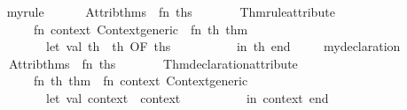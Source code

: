 \begin{isabellebody}
\begin{isamarkuptext}
\begin{description}
  \end{description}%
\end{isamarkuptext}%
\isamarkuptrue%
%
\isadelimML
\ \ %
\endisadelimML
%
\isatagML
{}\isamarkupfalse%
\ my{}rule\ {}\ {}\isanewline
\ \ \ \ Attrib{}thms\ {}{}\ {}fn\ ths\ {}{}\isanewline
\ \ \ \ \ \ Thm{}rule{}attribute\isanewline
\ \ \ \ \ \ \ \ {}fn\ context{}\ Context{}generic\ {}{}\ fn\ th{}\ thm\ {}{}\isanewline
\ \ \ \ \ \ \ \ \ \ let\ val\ th{}\ {}\ th\ OF\ ths\isanewline
\ \ \ \ \ \ \ \ \ \ in\ th{}\ end{}{}\ {}\isanewline
\isanewline
\ \ \isamarkupfalse%
\ my{}declaration\ {}\ {}\isanewline
\ \ \ \ Attrib{}thms\ {}{}\ {}fn\ ths\ {}{}\isanewline
\ \ \ \ \ \ Thm{}declaration{}attribute\isanewline
\ \ \ \ \ \ \ \ {}fn\ th{}\ thm\ {}{}\ fn\ context{}\ Context{}generic\ {}{}\isanewline
\ \ \ \ \ \ \ \ \ \ let\ val\ context{}\ {}\ context\isanewline
\ \ \ \ \ \ \ \ \ \ in\ context{}\ end{}{}\ {}%

\end{isabellebody}
